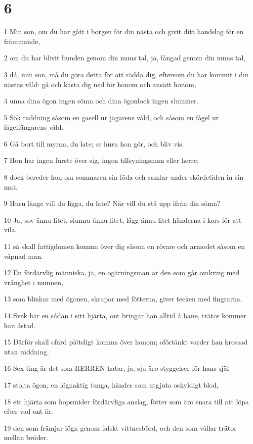 \chapter{6}

\par 1 Min son, om du har gått i borgen för din nästa och givit ditt handslag för en främmande,
\par 2 om du har blivit bunden genom din muns tal, ja, fångad genom din muns tal,
\par 3 då, min son, må du göra detta för att rädda dig, eftersom du har kommit i din nästas våld: gå och kasta dig ned för honom och ansätt honom,
\par 4 unna dina ögon ingen sömn och dina ögonlock ingen slummer.
\par 5 Sök räddning såsom en gasell ur jägarens våld, och såsom en fågel ur fågelfängarens våld.
\par 6 Gå bort till myran, du late; se huru hon gör, och bliv vis.
\par 7 Hon har ingen furste över sig, ingen tillsyningsman eller herre;
\par 8 dock bereder hon om sommaren sin föda och samlar under skördetiden in sin mat.
\par 9 Huru länge vill du ligga, du late? När vill du stå upp ifrån din sömn?
\par 10 Ja, sov ännu litet, slumra ännu litet, lägg ännu litet händerna i kors för att vila,
\par 11 så skall fattigdomen komma över dig såsom en rövare och armodet såsom en väpnad man.
\par 12 En fördärvlig människa, ja, en ogärningsman är den som går omkring med vrånghet i munnen,
\par 13 som blinkar med ögonen, skrapar med fötterna, giver tecken med fingrarna.
\par 14 Svek bär en sådan i sitt hjärta, ont bringar han alltid å bane, trätor kommer han åstad.
\par 15 Därför skall ofärd plötsligt komma över honom; oförtänkt varder han krossad utan räddning.
\par 16 Sex ting är det som HERREN hatar, ja, sju äro styggelser för hans själ
\par 17 stolta ögon, en lögnaktig tunga, händer som utgjuta oskyldigt blod,
\par 18 ett hjärta som hopsmider fördärvliga anslag, fötter som äro snara till att löpa efter vad ont är,
\par 19 den som främjar lögn genom falskt vittnesbörd, och den som vållar trätor mellan bröder.
